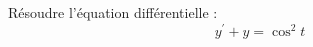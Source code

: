 R\'esoudre l'\'equation diff\'erentielle :
\begin{displaymath}
 y^\prime + y = \cos ^2 t
\end{displaymath}
\bigskip
